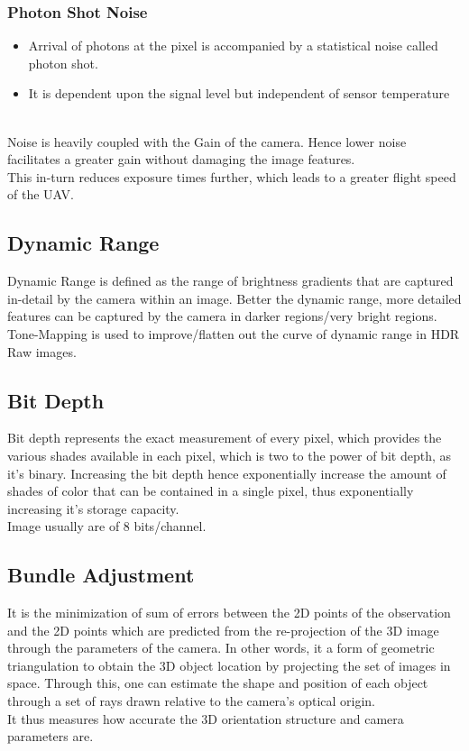 \documentclass[11pt,twocolumn,letterpaper]{article}
\begin{document}
\subsubsection{Photon Shot Noise}
\begin{itemize}
    \item  Arrival of photons at the pixel is accompanied by a statistical noise called photon shot.
    \item  It is dependent upon the signal level but independent of sensor temperature
\end{itemize}
 \\ Noise is heavily coupled with the Gain of the camera. Hence lower noise facilitates a greater gain without damaging the image features.
 \\ This in-turn reduces exposure times further, which leads to a greater flight speed of the UAV.


\subsection{Dynamic Range}
Dynamic Range is defined as the range of brightness gradients that are captured in-detail by the camera within an image. Better the dynamic range, more detailed features can be captured by the camera in darker regions/very bright regions. 
\\ Tone-Mapping is used to improve/flatten out the curve of dynamic range in HDR Raw images.

\subsection{Bit Depth}
Bit depth represents the exact measurement of every pixel, which provides the various shades available in each pixel, which is two to the power of bit depth, as it's binary. Increasing the bit depth hence exponentially increase the amount of shades of color that can be contained in a single pixel, thus exponentially increasing it's storage capacity.
\\ Image usually are of 8 bits/channel. 


\subsection{Bundle Adjustment}
It is the minimization of sum of errors between the 2D points of the observation and the 2D points which are predicted from the re-projection of the 3D image through the parameters of the camera. In other words, it a form of geometric triangulation to obtain the 3D object location by projecting the set of images in space. Through this, one can estimate the shape and position of each object through a set of rays drawn relative to the camera's optical origin.
\\ It thus measures how accurate the 3D orientation structure and camera parameters are.
\end{document}
